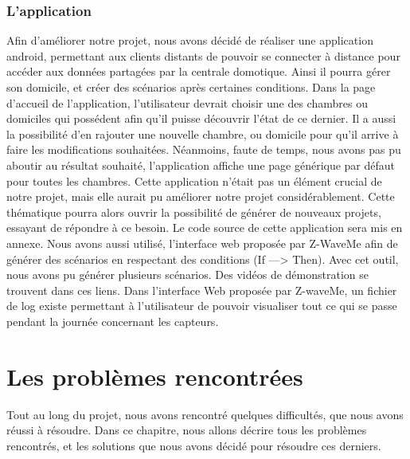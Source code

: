 \subsection*{L'application}
Afin d'améliorer notre projet, nous avons décidé de réaliser une application android, permettant aux clients distants de pouvoir se connecter à distance pour accéder aux données partagées par la centrale domotique. Ainsi il pourra gérer son domicile, et créer des scénarios après certaines conditions. Dans la page d'accueil de l'application, l'utilisateur devrait choisir une des chambres ou domiciles qui possédent afin qu'il puisse découvrir l'état de ce dernier. Il a aussi la possibilité d'en rajouter une nouvelle chambre, ou domicile pour qu'il arrive à faire les modifications souhaitées.\newline
Néanmoins, faute de temps, nous avons pas pu aboutir au résultat souhaité, l'application affiche une page générique par défaut pour toutes les chambres. Cette application n'était pas un élément crucial de notre projet, mais elle aurait pu améliorer notre projet considérablement. Cette thématique pourra alors ouvrir la possibilité de générer de nouveaux projets, essayant de répondre à ce besoin.\newline
Le code source de cette application sera mis en annexe.\newline
Nous avons aussi utilisé, l'interface web proposée par Z-WaveMe afin de générer des scénarios en respectant des conditions (If ---> Then). Avec cet outil, nous avons pu générer plusieurs scénarios. Des vidéos de démonstration se trouvent dans ces liens.\newline
Dans l'interface Web proposée par Z-waveMe, un fichier de log existe permettant à l'utilisateur de pouvoir visualiser tout ce qui se passe pendant la journée concernant les capteurs.




\newpage
\chapter{Les problèmes rencontrées}
Tout au long du projet, nous avons rencontré quelques difficultés, que nous avons réussi à résoudre. Dans ce chapitre, nous allons décrire tous les problèmes rencontrés, et les solutions que nous avons décidé pour résoudre ces derniers.
